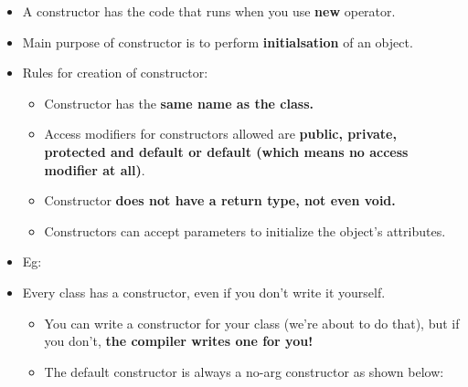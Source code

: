 \setlength{\columnsep}{3pt}
\begin{flushleft}

	\begin{itemize}
		\item A constructor has the code that runs when you use \textbf{new} operator. 
		\item Main purpose of constructor is to perform \textbf{initialsation} of an object.	
		\item Rules for creation of constructor:
		\begin{itemize}
			\item Constructor has the \textbf{same name as the class.} 
			\item Access modifiers for constructors allowed are \textbf{public, private, protected and default or default (which means no access modifier at all)}.
			\item Constructor \textbf{does not have a return type, not even void.}
			\item Constructors can accept parameters to initialize the object's attributes.
			\bigskip
		\end{itemize}

		\item Eg:
		\bigskip
		
		\bigskip
		
		\newpage
		\item Every class has a constructor, even if you don’t write it yourself.
		
		\bigskip
		{
			\begin{itemize}
				\item You can write a constructor for your class (we’re about to do
				that), but if you don’t, \textbf{the compiler writes one for you!}
				\item The default constructor is always a no-arg constructor as shown below:
			\end{itemize}
		}
		

\end{itemize}
\end{flushleft}
